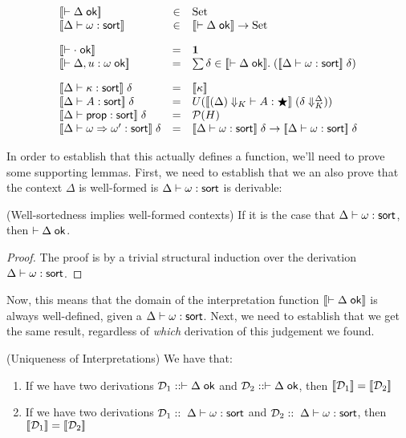 \begin{displaymath}
  \begin{array}{lcl}
    \interp{\judgeACtx{\Delta}} & \in & \mbox{Set} \\
    \interp{\judgeSort{\omega}} & \in & \interp{\judgeACtx{\Delta}} \to \mbox{Set} \\[1em]

    \interp{\judgeACtx{\cdot}} & = & \unittype \\
    \interp{\judgeACtx{\Delta, u:\omega}} & = & \sum \delta \in \interp{\judgeACtx{\Delta}}.\; 
                                                  (\interp{\judgeSort{\omega}}\;\delta) \\[1em]
 
    \interp{\judgeSort{\kappa}}\;\delta & = & \interp{\kappa} \\
    \interp{\judgeSort{A}}\;\delta & = & 
       U(\interp{\judgeWK[\restrictkind{\Delta}]{A}{\bigstar}}\;(\restricttyenv{\Delta}{\delta})) \\
    \interp{\judgeSort{\assert}}\;\delta & = & \powerset{H} \\
    \interp{\judgeSort{\omega \To \omega'}}\;\delta & = &  
       \interp{\judgeSort{\omega}}\;\delta \to \interp{\judgeSort{\omega}}\;\delta \\
  \end{array}
\end{displaymath}

In order to establish that this actually defines a function, we'll
need to prove some supporting lemmas. First, we need to establish that
we an also prove that the context $\Delta$ is well-formed is
${{\Delta}} \vdash {{\omega}} : {\mbox{\textsf{{sort}}}}$ is derivable:

\begin{lemma}{(Well-sortedness implies well-formed contexts)}
If it is the case that ${{\Delta}} \vdash {{\omega}} : {\mbox{\textsf{{sort}}}}$, then $\vdash {\Delta} \;\mbox{\textsf{{ok}}}$.
\end{lemma}
\begin{proof}
The proof is by a trivial structural induction over the derivation ${{\Delta}} \vdash {{\omega}} : {\mbox{\textsf{{sort}}}}$. 
\end{proof}

Now, this means that the domain of the interpretation function
$[\![{\vdash {\Delta} \;\mbox{\textsf{{ok}}}}]\!]$ is always well-defined, given a ${{\Delta}} \vdash {{\omega}} : {\mbox{\textsf{{sort}}}}$. Next,
we need to establish that we get the same result, regardless of \emph{which} derivation
of this judgement we found. 

\begin{lemma}{(Uniqueness of Interpretations)}
We have that:
\begin{enumerate}
\item If we have two derivations $\mathcal{D}_1 :: \vdash {\Delta} \;\mbox{\textsf{{ok}}}$
      and $\mathcal{D}_2 :: \vdash {\Delta} \;\mbox{\textsf{{ok}}}$, 
      then $[\![{\mathcal{D}_1}]\!] = [\![{\mathcal{D}_2}]\!]$
\item If we have two derivations $\mathcal{D}_1 ::\; {{\Delta}} \vdash {{\omega}} : {\mbox{\textsf{{sort}}}}$
      and $\mathcal{D}_2 ::\; {{\Delta}} \vdash {{\omega}} : {\mbox{\textsf{{sort}}}}$, 
      then $[\![{\mathcal{D}_1}]\!] = [\![{\mathcal{D}_2}]\!]$
\end{enumerate}
\end{lemma}

